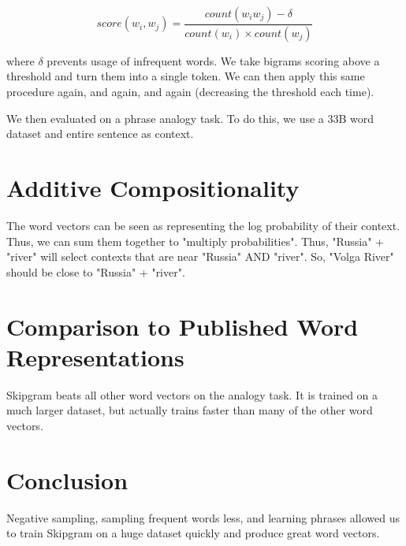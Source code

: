 \documentclass[a4paper]{article}
\begin{document}
$$
score(w_i, w_j) = \frac{count(w_i w_j) - \delta}{count(w_i) \times count(w_j)}
$$

where $\delta$ prevents usage of infrequent words. We take bigrams scoring
above a threshold and turn them into a single token. We can then apply this
same procedure again, and again, and again (decreasing the threshold each time).

We then evaluated on a phrase analogy task. To do this, we use a 33B word
dataset and entire sentence as context.

\section{Additive Compositionality}
The word vectors can be seen as representing the log probability of their
context. Thus, we can sum them together to "multiply probabilities". Thus,
"Russia" + "river" will select contexts that are near "Russia" AND "river".
So, "Volga River" should be close to "Russia" + "river".

\section{Comparison to Published Word Representations}
Skipgram beats all other word vectors on the analogy task. It is trained on a
much larger dataset, but actually trains faster than many of the other word
vectors.

\section{Conclusion}
Negative sampling, sampling frequent words less, and learning phrases allowed
us to train Skipgram on a huge dataset quickly and produce great word vectors.
\end{document}
